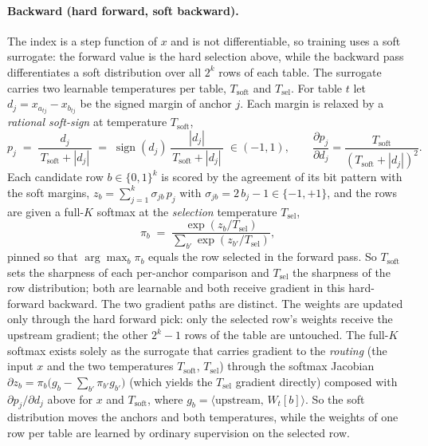 \documentclass[11pt]{article}
\begin{document}
\paragraph{Backward (hard forward, soft backward).} The index is a step function of $x$ and
is not differentiable, so training uses a soft surrogate: the forward value is the hard
selection above, while the backward pass differentiates a soft distribution over all $2^{k}$
rows of each table. The surrogate carries two learnable temperatures per table, $T_{\mathrm{soft}}$
and $T_{\mathrm{sel}}$. For table $t$ let $d_{j}=x_{a_{tj}}-x_{b_{tj}}$ be the signed margin of
anchor $j$. Each margin is relaxed by a \emph{rational soft-sign} at temperature $T_{\mathrm{soft}}$,
\begin{equation}
p_{j}\;=\;\frac{d_{j}}{\,T_{\mathrm{soft}}+|d_{j}|\,}\;=\;\operatorname{sign}(d_{j})\,\frac{|d_{j}|}{\,T_{\mathrm{soft}}+|d_{j}|\,}\;\in(-1,1),
\qquad
\frac{\partial p_{j}}{\partial d_{j}}=\frac{T_{\mathrm{soft}}}{(T_{\mathrm{soft}}+|d_{j}|)^{2}} .
\end{equation}
Each candidate row $b\in\{0,1\}^{k}$ is scored by the agreement of its bit pattern with the
soft margins, $z_{b}=\sum_{j=1}^{k} \sigma_{jb}\,p_{j}$ with $\sigma_{jb}=2\,b_{j}-1\in\{-1,+1\}$,
and the rows are given a full-$K$ softmax at the \emph{selection} temperature $T_{\mathrm{sel}}$,
\begin{equation}
\pi_{b}\;=\;\frac{\exp(z_{b}/T_{\mathrm{sel}})}{\sum_{b'}\exp(z_{b'}/T_{\mathrm{sel}})} ,
\end{equation}
pinned so that $\arg\max_{b}\pi_{b}$ equals the row selected in the forward pass. So
$T_{\mathrm{soft}}$ sets the sharpness of each per-anchor comparison and $T_{\mathrm{sel}}$
the sharpness of the row distribution; both are learnable and both receive gradient in this
hard-forward backward. The two gradient paths are distinct. The weights are updated only
through the hard forward pick: only the selected row's weights receive the upstream gradient;
the other $2^{k}-1$ rows of the table are untouched. The full-$K$ softmax exists solely as the
surrogate that carries gradient to the \emph{routing} (the input $x$ and the two
temperatures $T_{\mathrm{soft}}$, $T_{\mathrm{sel}}$) through the softmax Jacobian
$\partial z_{b}=\pi_{b}\big(g_{b}-\sum_{b'}\pi_{b'}g_{b'}\big)$ (which yields the
$T_{\mathrm{sel}}$ gradient directly) composed with $\partial p_{j}/\partial d_{j}$ above for
$x$ and $T_{\mathrm{soft}}$, where $g_{b}=\langle\text{upstream},\,W_t[b]\rangle$. So the soft
distribution moves the anchors and both temperatures, while the weights of one row per table
are learned by ordinary supervision on the selected row.
\end{document}
